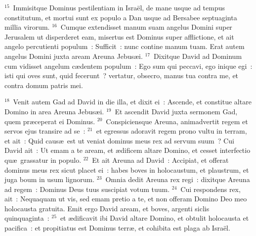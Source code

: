 ${}^{15}$~Immisitque Dominus pestilentiam in Isra\"el, de mane usque ad tempus constitutum, et mortui sunt ex populo a Dan usque ad Bersabee septuaginta millia virorum.
${}^{16}$~Cumque extendisset manum suam angelus Domini super Jerusalem ut disperderet eam, misertus est Dominus super afflictione, et ait angelo percutienti populum~: Sufficit~: nunc contine manum tuam. Erat autem angelus Domini juxta aream Areuna Jebus\ae i.
${}^{17}$~Dixitque David ad Dominum cum vidisset angelum c\ae dentem populum~: Ego sum qui peccavi, ego inique egi~: isti qui oves sunt, quid fecerunt~? vertatur, obsecro, manus tua contra me, et contra domum patris mei.


${}^{18}$~Venit autem Gad ad David in die illa, et dixit ei~: Ascende, et constitue altare Domino in area Areuna Jebus\ae i.
${}^{19}$~Et ascendit David juxta sermonem Gad, quem pr\ae ceperat ei Dominus.
${}^{20}$~Conspiciensque Areuna, animadvertit regem et servos ejus transire ad se~:
${}^{21}$~et egressus adoravit regem prono vultu in terram, et ait~: Quid caus\ae\ est ut veniat dominus meus rex ad servum suum~? Cui David ait~: Ut emam a te aream, et \ae dificem altare Domino, et cesset interfectio qu\ae\ grassatur in populo.
${}^{22}$~Et ait Areuna ad David~: Accipiat, et offerat dominus meus rex sicut placet ei~: habes boves in holocaustum, et plaustrum, et juga boum in usum lignorum.
${}^{23}$~Omnia dedit Areuna rex regi~: dixitque Areuna ad regem~: Dominus Deus tuus suscipiat votum tuum.
${}^{24}$~Cui respondens rex, ait~: Nequaquam ut vis, sed emam pretio a te, et non offeram Domino Deo meo holocausta gratuita. Emit ergo David aream, et boves, argenti siclis quinquaginta~:
${}^{25}$~et \ae dificavit ibi David altare Domino, et obtulit holocausta et pacifica~: et propitiatus est Dominus terr\ae , et cohibita est plaga ab Isra\"el.
